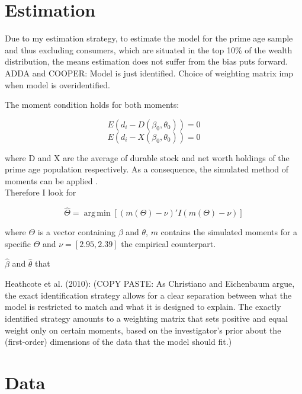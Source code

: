\documentclass[a4paper,12pt]{article}
\begin{document}
\section{Estimation}
\label{estimation_procedure}

Due to my estimation strategy, to estimate the model for the prime age sample and thus excluding consumers, which are situated in the top 10\% of the wealth distribution, the means estimation does not suffer from the bias \cite{cagetti2003} puts forward. \\  

ADDA and COOPER: 
Model is just identified. Choice of weighting matrix imp when model is overidentified. 

The moment condition holds for both moments: 

\[ E(d_{i} -  D(\beta_{0},\theta_{0})) = 0 \]
\[ E(d_{i} -  X(\beta_{0},\theta_{0})) = 0 \]

where D and X are the average of durable stock and net worth holdings of the prime age population respectively. As a consequence, the simulated method of moments can be applied \citep{duffie1993}.\\

Therefore I look for 

\[ \widehat{\Theta} = \operatorname{arg\,min}[(m(\Theta )-\nu)'I(m(\Theta )-\nu)] \]

where $\Theta$ is a vector containing $\beta$ and $\theta$, $m$ contains the simulated moments for a specific $\Theta$ and $\nu = [2.95,2.39]$ the empirical counterpart. 

$\hat{\beta}$ and $\hat{\theta}$ that 




Heathcote et al. (2010): (COPY PASTE: As Christiano and Eichenbaum argue, the exact identification strategy allows for a clear separation between what the model is restricted to match and what it is designed to explain. The exactly identified strategy amounts to a weighting matrix that sets positive and equal weight only on certain moments, based on the investigator's prior about the (first-order) dimensions of the data that the model should fit.)

\section{Data}
\label{data}
\end{document}

